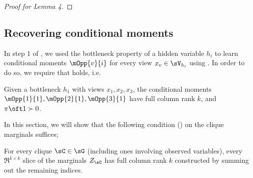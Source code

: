 \begin{proof}[Proof for Lemma 4]


\end{proof}

\subsection{Recovering conditional moments}

In step 1 of \LearnMarginals, we used the bottleneck property of a hidden
  variable $h_i$ to learn conditional moments $\mOpp{v}{i}$ for every
  view $x_v \in \sV_{h_i}$ using \TensorFactorize. 
In order to do so, we require that  holds, i.e.
\begin{assumption*}[1]
  Given a bottleneck $h_1$ with views $x_1, x_2, x_3$, the conditional
  moments $\mOpp{1}{1}, \mOpp{2}{1}, \mOpp{3}{1}$ have full column rank
  $k$, and $\pi\oft 1 \succ 0$.
\end{assumption*}

In this section, we will show that the following condition
  () on the clique marginals suffices;
\begin{assumption*}[2]
For every clique $\sC \in \sG$ (including ones involving observed variables),
  every $\Re^{k \times k}$ slice of the marginals $Z_\sC$ has full column
  rank $k$ constructed by summing out the remaining indices.
\end{assumption*}

